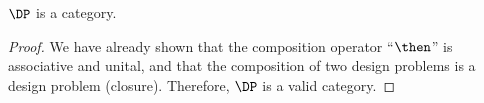 \begin{lemma}
    $\DP$ is a category.
\end{lemma}
\begin{proof}
We have already shown that the composition operator ``$\then$'' is associative and unital, and that the composition of two design problems is a design problem (closure). Therefore, $\DP$ is a valid category.
\end{proof}
